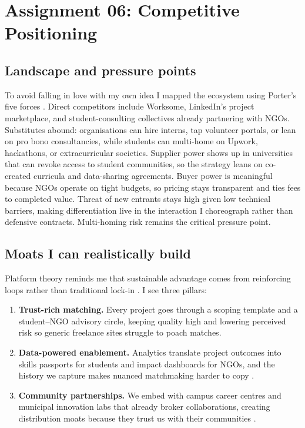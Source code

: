 \section*{Assignment 06: Competitive Positioning}

\subsection*{Landscape and pressure points}
To avoid falling in love with my own idea I mapped the ecosystem using Porter’s five forces \citep{Porter2008}. Direct competitors include Worksome, LinkedIn’s project marketplace, and student-consulting collectives already partnering with NGOs. Substitutes abound: organisations can hire interns, tap volunteer portals, or lean on pro bono consultancies, while students can multi-home on Upwork, hackathons, or extracurricular societies. Supplier power shows up in universities that can revoke access to student communities, so the strategy leans on co-created curricula and data-sharing agreements. Buyer power is meaningful because NGOs operate on tight budgets, so pricing stays transparent and ties fees to completed value. Threat of new entrants stays high given low technical barriers, making differentiation live in the interaction I choreograph rather than defensive contracts. Multi-homing risk remains the critical pressure point.

\subsection*{Moats I can realistically build}
Platform theory reminds me that sustainable advantage comes from reinforcing loops rather than traditional lock-in \citep{Choudary2016,Reillier2017,Lecture07}. I see three pillars:
\begin{enumerate}
  \item \textbf{Trust-rich matching.} Every project goes through a scoping template and a student--NGO advisory circle, keeping quality high and lowering perceived risk so generic freelance sites struggle to poach matches.
  \item \textbf{Data-powered enablement.} Analytics translate project outcomes into skills passports for students and impact dashboards for NGOs, and the history we capture makes nuanced matchmaking harder to copy \citep{FarrellSaloner1986}.
  \item \textbf{Community partnerships.} We embed with campus career centres and municipal innovation labs that already broker collaborations, creating distribution moats because they trust us with their communities \citep{ShapiroVarian1999}.
\end{enumerate}

